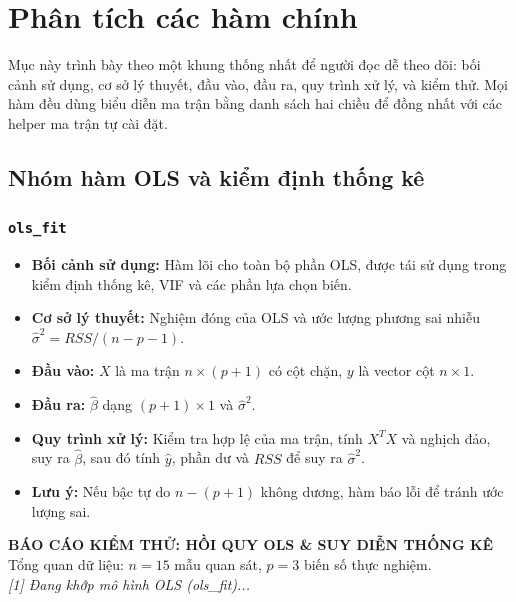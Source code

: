 \documentclass[a4paper]{article}
\newcommand{\code}[1]{\colorbox{light-gray}{\texttt{#1}}}
\begin{document}
\section{Phân tích các hàm chính}

Mục này trình bày theo một khung thống nhất để người đọc dễ theo dõi: bối cảnh sử dụng, cơ sở lý thuyết, đầu vào, đầu ra, quy trình xử lý, và kiểm thử. Mọi hàm đều dùng biểu diễn ma trận bằng danh sách hai chiều để đồng nhất với các helper ma trận tự cài đặt.

\subsection{Nhóm hàm OLS và kiểm định thống kê}

\subsubsection{\code{ols\_fit}}
\begin{itemize}[leftmargin=*]
    \item \textbf{Bối cảnh sử dụng:} Hàm lõi cho toàn bộ phần OLS, được tái sử dụng trong kiểm định thống kê, VIF và các phần lựa chọn biến.
    \item \textbf{Cơ sở lý thuyết:} Nghiệm đóng của OLS và ước lượng phương sai nhiễu $\hat{\sigma}^2 = RSS/(n-p-1)$.
    \item \textbf{Đầu vào:} $X$ là ma trận $n\times(p+1)$ có cột chặn, $y$ là vector cột $n\times1$.
    \item \textbf{Đầu ra:} $\hat{\beta}$ dạng $(p+1)\times1$ và $\hat{\sigma}^2$.
    \item \textbf{Quy trình xử lý:} Kiểm tra hợp lệ của ma trận, tính $X^T X$ và nghịch đảo, suy ra $\hat{\beta}$, sau đó tính $\hat{y}$, phần dư và $RSS$ để suy ra $\hat{\sigma}^2$.
    \item \textbf{Lưu ý:} Nếu bậc tự do $n-(p+1)$ không dương, hàm báo lỗi để tránh ước lượng sai.
\end{itemize}
\begin{mdframed}[backgroundcolor=light-gray, roundcorner=5pt, hidealllines=true]
\textbf{BÁO CÁO KIỂM THỬ: HỒI QUY OLS \& SUY DIỄN THỐNG KÊ} \\
Tổng quan dữ liệu: $n = 15$ mẫu quan sát, $p = 3$ biến số thực nghiệm. \\
\textit{[1] Đang khớp mô hình OLS (ols\_fit)...}
\end{mdframed}
\end{document}
